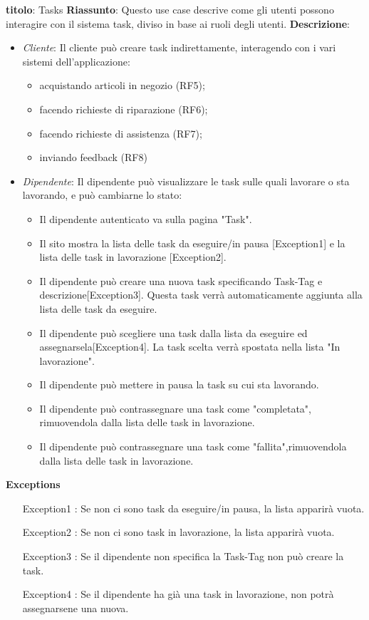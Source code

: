 \documentclass{report}
\begin{document}
\textbf{titolo}: Tasks\newline
\textbf{Riassunto}: Questo use case descrive come gli utenti possono interagire con il sistema task, diviso in base ai ruoli degli utenti.\newline
\textbf{Descrizione}: 
	\begin{itemize}
		\item \textit{Cliente}: Il cliente può creare task indirettamente, interagendo con i vari sistemi dell'applicazione:
		\begin{itemize}
			\item acquistando articoli in negozio (RF5);
			\item facendo richieste di riparazione (RF6);
			\item facendo richieste di assistenza (RF7);
			\item inviando feedback (RF8)
		\end{itemize}
		\item \textit{Dipendente}: Il dipendente può visualizzare le task sulle quali lavorare o sta lavorando, e può cambiarne lo stato:
		\begin{itemize}
			\item Il dipendente autenticato va sulla pagina "Task".
			\item Il sito mostra la lista delle task da eseguire/in pausa [Exception1] e la lista delle task in lavorazione [Exception2]. 
			\item Il dipendente può creare una nuova task specificando Task-Tag e descrizione[Exception3]. Questa task verrà automaticamente aggiunta alla lista delle task da eseguire.
			\item Il dipendente può scegliere una task dalla lista da eseguire ed assegnarsela[Exception4]. La task scelta verrà spostata nella lista "In lavorazione".  
			\item Il dipendente può mettere in pausa la task su cui sta lavorando.
			\item Il dipendente può contrassegnare una task come "completata", rimuovendola dalla lista delle task in lavorazione.
			\item Il dipendente può contrassegnare una task come "fallita",rimuovendola dalla lista delle task in lavorazione. 
		\end{itemize}
	\end{itemize}
\textbf{Exceptions}
\begin{itemize}
	\item [Exception1]: Se non ci sono task da eseguire/in pausa, la lista apparirà vuota.
	\item [Exception2]: Se non ci sono task in lavorazione, la lista apparirà vuota.
	\item [Exception3]: Se il dipendente non specifica la Task-Tag non può creare la task.
	\item [Exception4]: Se il dipendente ha già una task in lavorazione, non potrà assegnarsene una nuova.

\end{itemize}
\end{document}
